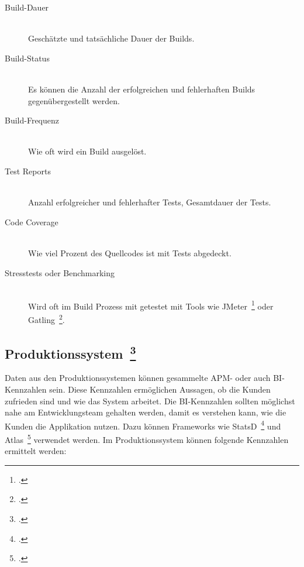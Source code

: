 \begin{description}
  \item[Build-Dauer] \hfill \\ Geschätzte und tatsächliche Dauer der Builds.
  \item[Build-Status] \hfill \\ Es können die Anzahl der erfolgreichen und fehlerhaften Builds gegenübergestellt werden.
  \item[Build-Frequenz] \hfill \\ Wie oft wird ein Build ausgelöst.
  \item[Test Reports] \hfill \\ Anzahl erfolgreicher und fehlerhafter Tests, Gesamtdauer der Tests.
  \item[Code Coverage] \hfill \\ Wie viel Prozent des Quellcodes ist mit Tests abgedeckt.
  \item[Stresstests oder Benchmarking] \hfill \\ Wird oft im Build Prozess mit getestet mit Tools wie JMeter~\footcite[][]{jmeter} oder Gatling~\footcite[][]{gatling}.
\end{description}

\clearpage
\subsection[Produktionssystem]{Produktionssystem~\footcite[vgl.][S.107ff]{davis_agile_2015}}

Daten aus den Produktionssystemen können gesammelte \ac{APM}- oder auch \ac{BI}-Kennzahlen sein.
Diese Kennzahlen ermöglichen Aussagen, ob die Kunden zufrieden sind und wie das System arbeitet.
Die \ac{BI}-Kennzahlen sollten möglichst nahe am Entwicklungsteam gehalten werden, damit es verstehen kann, wie die Kunden die Applikation nutzen.
Dazu können Frameworks wie StatsD~\footcite[][]{statsd} und Atlas~\footcite[][]{atlas} verwendet werden.
Im Produktionssystem können folgende Kennzahlen ermittelt werden:

